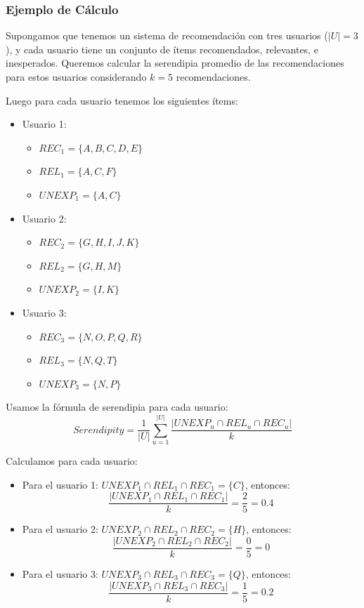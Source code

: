 \documentclass[11pt,a4paper,twoside]{thesis}
\begin{document}
\subsubsection*{Ejemplo de Cálculo}

Supongamos que tenemos un sistema de recomendación con tres usuarios (\( |U| = 3 \)), y cada usuario tiene un conjunto de ítems recomendados, relevantes, e inesperados. Queremos calcular la serendipia promedio de las recomendaciones para estos usuarios considerando \( k = 5 \) recomendaciones.

Luego para cada usuario tenemos los siguientes ítems:
\begin{itemize}
	\item Usuario 1:
	      \begin{itemize}
		      \item $REC_1 = \{A, B, C, D, E\}$
		      \item $REL_1 = \{A, C, F\}$
		      \item $UNEXP_1 = \{A, C\}$
	      \end{itemize}
	\item Usuario 2:
	      \begin{itemize}
		      \item $REC_2 = \{G, H, I, J, K\}$
		      \item $REL_2 = \{G, H, M\}$
		      \item $UNEXP_2 = \{I, K\}$
	      \end{itemize}
	\item Usuario 3:
	      \begin{itemize}
		      \item $REC_3 = \{N, O, P, Q, R\}$
		      \item $REL_3 = \{N, Q, T\}$
		      \item $UNEXP_3 = \{N, P\}$
	      \end{itemize}
\end{itemize}

Usamos la fórmula de serendipia para cada usuario:
\[
	Serendipity = \frac{1}{|U|} \sum_{u=1}^{|U|} \frac{|UNEXP_u \cap REL_u \cap REC_u|}{k}
\]

Calculamos para cada usuario:
\begin{itemize}
	\item Para el usuario 1: \( UNEXP_1 \cap REL_1 \cap REC_1 = \{C\} \), entonces:
	      \[
		      \frac{|UNEXP_1 \cap REL_1 \cap REC_1|}{k} = \frac{2}{5} = 0.4
	      \]
	\item Para el usuario 2: \( UNEXP_2 \cap REL_2 \cap REC_2 = \{H\} \), entonces:
	      \[
		      \frac{|UNEXP_2 \cap REL_2 \cap REC_2|}{k} = \frac{0}{5} = 0
	      \]
	\item Para el usuario 3: \( UNEXP_3 \cap REL_3 \cap REC_3 = \{Q\} \), entonces:
	      \[
		      \frac{|UNEXP_3 \cap REL_3 \cap REC_3|}{k} = \frac{1}{5} = 0.2
	      \]
\end{itemize}
\end{document}

